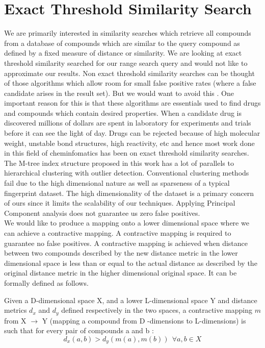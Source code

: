 \section{Exact Threshold Similarity Search}
\label{exact}
We are primarily interested in similarity searches which retrieve all compounds from a database of compounds which are similar to the query compound as defined by a fixed measure of distance or similarity. We are looking at exact threshold similarity searched for our range search query and would not like to approximate our results. Non exact threshold similarity searches can be thought of those algorithms which allow room for small false positive rates (where a false candidate arises in the result set). But we would want to avoid this . One important reason for this is that these algorithms are essentials used to find drugs and compounds which contain desired properties. When a candidate drug is discovered millions of dollars are spent in laboratory for experiments and trials before it can see the light of day. Drugs can be rejected because of high molecular weight, unstable bond structures, high reactivity, etc and hence most work done in this field of cheminfomatics has been on exact threshold similarity searches.\\

The M-tree index structure proposed in this work has a lot of parallels to hierarchical clustering with outlier detection. Conventional clustering methods fail due to the high dimensional nature as well as sparseness of a typical fingerprint dataset. The high dimensionality of the dataset is a primary concern of ours since it limits the scalability of our techniques. Applying Principal Component analysis does not guarantee us zero false positives. \\

We would like to produce a mapping onto a lower dimensional space where we can achieve a contractive mapping. A contractive mapping is required to guarantee no false positives. A contractive mapping is achieved when distance between two compounds described by the new distance metric in the lower dimensional space is less than or equal to the actual distance as described by the original distance metric in the higher dimensional original space. It can be formally defined as follows.\\

\begin{dfn}
 Given a D-dimensional space X, and a lower L-dimensional space Y and distance metrics $d_x$ and $d_y$ defined respectively in the two spaces, a contractive mapping $m$ from X $\rightarrow$ Y (mapping a compound from D -dimensions to L-dimensions) is such that for every pair of compounds a and b : \\
\begin{equation}
  d_x(a,b) > d_y(m(a),m(b))~~ \forall a,b \in X 
\end{equation}
\end{dfn}

